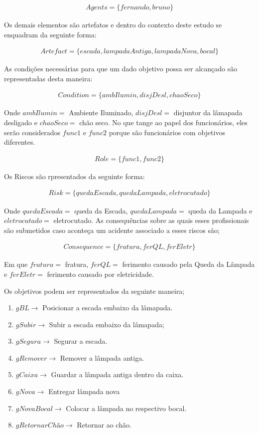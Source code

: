 \begin{eqnarray}\label{agentesintrodutorycase} \nonumber
	Agents = \{ fernando, bruno \}
\end{eqnarray}

Os demais elementos são artefatos e dentro do contexto deste estudo se enquadram da seguinte forma:

\begin{eqnarray}
	Artefact = \{ escada, lampadaAntiga, lampadaNova, bocal \} \nonumber
\end{eqnarray}

As condições necessárias para que um dado objetivo possa ser alcançado são representadas desta maneira: 

\begin{eqnarray}
	Condition = \{ ambIlumin, disjDesl, chaoSeco \} \nonumber
\end{eqnarray}

Onde $ambIlumin =$ Ambiente Iluminado, $disjDesl = $ disjuntor da lâmapada desligado e $chaoSeco = $ chão seco. No que tange ao papel dos funcionários, eles serão considerados $func1$ e $func2$ porque são funcionários com objetivos diferentes. 

\begin{eqnarray}
	Role = \{ func1,func2 \}
\end{eqnarray}

Os Riscos são rpresentados da seguinte forma: 

\begin{eqnarray}
	Risk = \{ quedaEscada, quedaLampada, eletrocutado \}
\end{eqnarray}

Onde $quedaEscada =$ queda da Escada, $quedaLampada =$ queda da Lampada e $eletrocutado =$ eletrocutado. As consequências sobre as quais esses profissionais são submetidos caso aconteça um acidente associado a esses riscos são;

\begin{eqnarray}
	Consequence = \{fratura,ferQL, ferEletr\}
\end{eqnarray}

Em que $fratura =$ fratura, $ferQL =$ ferimento causado pela Queda da Lâmpada e $ferEletr =$ ferimento causado por eletricidade.

Os objetivos podem ser representados da seguinte maneira; 

\begin{enumerate}
	\item $gBL \to $ Posicionar a escada embaixo da lâmapada.
	\item $gSubir \to $ Subir a escada embaixo da lâmapada;
	\item $gSegura \to $ Segurar a escada. 
	\item $gRemover \to $ Remover a lâmpada antiga.
	\item $gCaixa \to $ Guardar a lâmpada antiga dentro da caixa.
	\item $gNova \to $ Entregar lâmpada nova
	\item $gNovaBocal \to$ Colocar a lâmpada no respectivo bocal.
	\item $gRetornarChão \to$ Retornar ao chão.
\end{enumerate}

